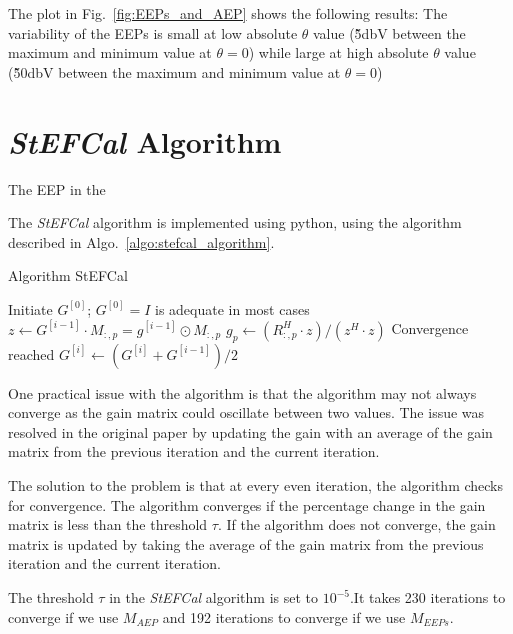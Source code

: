 \documentclass[10pt,a4paper,twocolumn]{article}
\begin{document}
The plot in Fig.~\ref{fig:EEPs_and_AEP} shows the following results: The variability of the EEPs is small at low absolute $\theta$ value (\~5dbV between the maximum and minimum value at $\theta = 0$) while large at high absolute $\theta$ value (\~50dbV between the maximum and minimum value at $\theta = 0$)

\section{\textit{StEFCal} Algorithm}
The EEP in the 

The \textit{StEFCal} algorithm is implemented using python, using the algorithm described in Algo.~\ref{algo:stefcal_algorithm}. 

\begin{algorithm}
\caption{Algorithm StEFCal}
\begin{algorithmic}[1]
\State Initiate $G^{[0]}$; $G^{[0]} = I$ is adequate in most cases
        \State $z \leftarrow G^{[i-1]} \cdot M_{:,p} = g^{[i-1]} \odot M_{:,p}$
        \State $g_p \leftarrow (R_{:,p}^H \cdot z)/(z^H \cdot z)$
    \EndFor
            \State Convergence reached
        \Else
            \State $G^{[i]} \leftarrow (G^{[i]} + G^{[i-1]})/2$
        \EndIf
    \EndIf
\EndFor
\label{algo:stefcal_algorithm}
\end{algorithmic}
\end{algorithm}


One practical issue with the algorithm is that the algorithm may not always converge as the gain matrix could oscillate between two values. The issue was resolved in the original paper by updating the gain with an average of the gain matrix from the previous iteration and the current iteration.

The solution to the problem is that at every even iteration, the algorithm checks for convergence. The algorithm converges if the percentage change in the gain matrix is less than the threshold $\tau$. If the algorithm does not converge, the gain matrix is updated by taking the average of the gain matrix from the previous iteration and the current iteration. 

The threshold $\tau$ in the \textit{StEFCal} algorithm is set to $10^{-5}$.It takes 230 iterations to converge if we use $M_{AEP}$ and 192 iterations to converge if we use $M_{EEPs}$.
\end{document}
